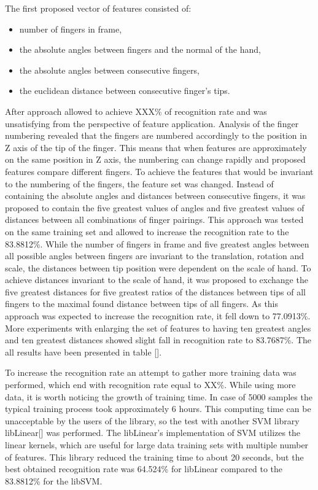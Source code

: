 The first proposed vector of features consisted of:
\begin{itemize}
\item number of fingers in frame,
\item the absolute angles between fingers and the normal of the hand,
\item the absolute angles between consecutive fingers,
\item the euclidean distance between consecutive finger's tips.
\end{itemize} 

After approach allowed to achieve XXX\% of recognition rate and was unsatisfying from the perspective of feature application. 
Analysis of the finger numbering revealed that the fingers are numbered accordingly to the position in Z axis of the tip of the finger.
This means that when features are approximately on the same position in Z axis, the numbering can change rapidly and proposed features compare different fingers.
To achieve the features that would be invariant to the numbering of the fingers, the feature set was changed.
Instead of containing the absolute angles and distances between consecutive fingers, it was proposed to contain the five greatest values of angles and five greatest values of distances between all combinations of finger pairings.
This approach was tested on the same training set and allowed to increase the recognition rate to the 83.8812\%.
While the number of fingers in frame and five greatest angles between all possible angles between fingers are invariant to the translation, rotation and scale, the distances between tip position were dependent on the scale of hand.
To achieve distances invariant to the scale of hand, it was proposed to exchange the five greatest distances for five greatest ratios of the distances between tips of all fingers to the maximal found distance between tips of all fingers.
As this approach was expected to increase the recognition rate, it fell down to 77.0913\%.
More experiments with enlarging the set of features to having ten greatest angles and ten greatest distances showed slight fall in recognition rate to 83.7687\%. 
The all results have been presented in table [].

To increase the recognition rate an attempt to gather more training data was performed, which end with recognition rate equal to XX\%. 
While using more data, it is worth noticing the growth of training time. In case of 5000 samples the typical training process took approximately 6 hours. 
This computing time can be unacceptable by the users of the library, so the test with another SVM library libLinear[] was performed. 
The libLinear's implementation of SVM utilizes the linear kernels, which are useful for large data training sets with multiple number of features. 
This library reduced the training time to about 20 seconds, but the best obtained recognition rate was 64.524\% for libLinear compared to the 83.8812\% for the libSVM.


